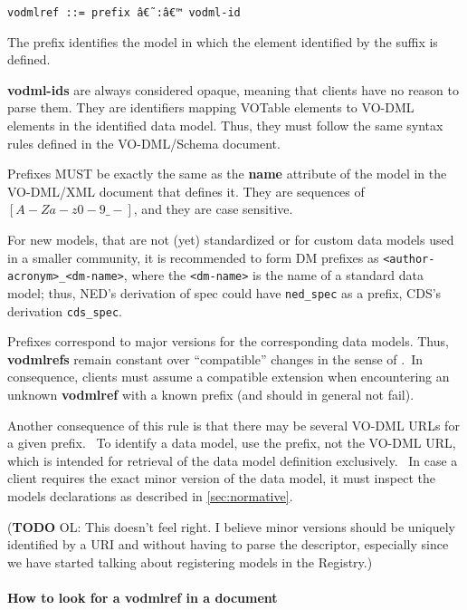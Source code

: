 \documentclass[11pt,a4paper]{ivoa}
\begin{document}
\begin{verbatim}
vodmlref ::= prefix â€˜:â€™ vodml-id
\end{verbatim}

The prefix identifies the model in which the element identified by the
suffix is defined.

\textbf{vodml-ids} are always considered opaque, meaning that clients
have no reason to parse them. They are identifiers mapping VOTable
elements to VO-DML elements in the identified data model. Thus, they
must follow the same syntax rules defined in the VO-DML/Schema document.

Prefixes MUST be exactly the same as the \textbf{name} attribute of the
model in the VO-DML/XML document that defines it. They are sequences of
$[A-Za-z0-9\_-]$, and they are case sensitive.

For new models, that are not (yet) standardized or for custom data
models used in a smaller community, it is recommended to form DM
prefixes as
\texttt{\textless{}author-acronym\textgreater{}\_\textless{}dm-name\textgreater{}},
where the \texttt{\textless{}dm-name\textgreater{}} is the name of a
standard data model; thus, NED's derivation of spec could have
\texttt{ned\_spec} as a prefix, CDS's derivation \texttt{cds\_spec}.

Prefixes correspond to major versions for the corresponding data models.
Thus, \textbf{vodmlrefs} remain constant over ``compatible'' changes in
the sense of \cite{2018ivoa.spec.0910L}.~In consequence, clients must assume a
compatible extension when encountering an unknown \textbf{vodmlref} with
a known prefix (and should in general not fail).

Another consequence of this rule is that there may be several VO-DML
URLs for a given prefix. ~To identify a data model, use the prefix, not
the VO-DML URL, which is intended for retrieval of the data model
definition exclusively. ~In case a client requires the exact minor
version of the data model, it must inspect the models declarations as
described in \ref{sec:normative}.

(\textbf{TODO} OL: This doesn't feel right. I believe minor versions
should be uniquely identified by a URI and without having to parse the
descriptor, especially since we have started talking about registering
models in the Registry.)

\paragraph{How to look for a vodmlref in a
document}\label{how-to-look-for-a-vodmlref-in-a-document}
\end{document}

